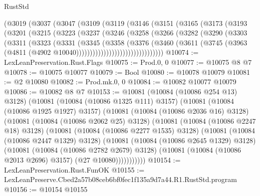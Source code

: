 \begin{lexlean}{RustStd}
\begin{coremodule}
    (@3019
      (@3037
        (@3047
          (@3109
            (@3119
              (@3146
                (@3151
                  (@3165
                    (@3173
                      (@3193
                        (@3201
                          (@3215
                            (@3223
                              (@3237
                                (@3246
                                  (@3258
                                    (@3266
                                      (@3282
                                        (@3290
                                          (@3303
                                            (@3311
                                              (@3323
                                                (@3331
                                                  (@3345
                                                    (@3358
                                                      (@3376
                                                        (@3460
                                                          (@3611
                                                            (@3745
                                                              (@3963
                                                                (@4811
                                                                  (@4902
                                                                    @10040))))))))))))))))))))))))))))))))
@10074 := LexLeanPreservation.Rust.Flags
@10075 := Prod.{0, 0}
@10077 := @10075 @8 @7
@10078 := @10075 @10077
@10079 := Bool
@10080 := @10078 @10079
@10081 := @2 @10080
@10082 := Prod.mk.{0, 0}
@10084 := @10082 @10077 @10079
@10086 := @10082 @8 @7
@10153 := @10081
    (@10084 (@10086 @254 @13) @3128)
    (@10081
      (@10084 (@10086 @1325 @111) @3157)
      (@10081
        (@10084 (@10086 @1925 @1927) @3157)
        (@10081
          (@10084 (@10086 @2036 @16) @3128)
          (@10081
            (@10084 (@10086 @2062 @25) @3128)
            (@10081
              (@10084 (@10086 @2247 @18) @3128)
              (@10081
                (@10084 (@10086 @2277 @1535) @3128)
                (@10081
                  (@10084 (@10086 @2447 @1329) @3128)
                  (@10081
                    (@10084 (@10086 @2645 @1329) @3128)
                    (@10081
                      (@10084 (@10086 @2782 @2679) @3128)
                      (@10081 (@10084 (@10086 @2013 @2696) @3157) (@27 @10080)))))))))))
@10154 := LexLeanPreservation.Rust.FunOK
@10155 := LexLeanPreserve.Cbed2a57b08ceb6bf0fec1f135a9d7a44.R1.RustStd.program
@10156 := @10154 @10155

\end{coremodule}
\end{lexlean}
